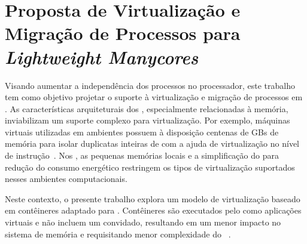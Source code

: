 \chapter{Proposta de Virtualização e Migração de Processos para \textit{Lightweight Manycores}}
\label{chap.dev.virtualizacao}

Visando aumentar a independência dos processos no processador, este trabalho tem como objetivo projetar o suporte à virtualização e migração de processos em \lws. As características arquiteturais dos \lws, especialmente relacionadas à memória, inviabilizam um suporte complexo para virtualização. Por exemplo, máquinas virtuais utilizadas em ambientes \cloud possuem à disposição centenas de GBs de memória para isolar duplicatas inteiras de \oss com a ajuda de virtualização no nível de instrução~\cite{sharma2016containers}. Nos \lws, as pequenas memórias locais e a simplificação do \hardware para redução do consumo energético restringem os tipos de virtualização suportados nesses ambientes computacionais.

Neste contexto, o presente trabalho explora um modelo de virtualização baseado em contêineres adaptado para \lws. Contêineres são executados pelo \os como aplicações virtuais e não incluem um \os convidado, resultando em um menor impacto no sistema de memória e requisitando menor complexidade do \hardware~\cite{thalheim2018cntr, sharma2016containers}.


